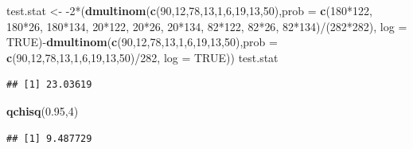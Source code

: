 \documentclass[]{book}
\newenvironment{Shaded}{\begin{snugshade}}{\end{snugshade}}
\newcommand{\KeywordTok}[1]{\textcolor[rgb]{0.13,0.29,0.53}{\textbf{{#1}}}}
\newcommand{\DataTypeTok}[1]{\textcolor[rgb]{0.13,0.29,0.53}{{#1}}}
\newcommand{\DecValTok}[1]{\textcolor[rgb]{0.00,0.00,0.81}{{#1}}}
\newcommand{\FloatTok}[1]{\textcolor[rgb]{0.00,0.00,0.81}{{#1}}}
\newcommand{\StringTok}[1]{\textcolor[rgb]{0.31,0.60,0.02}{{#1}}}
\newcommand{\OtherTok}[1]{\textcolor[rgb]{0.56,0.35,0.01}{{#1}}}
\newcommand{\NormalTok}[1]{{#1}}
\begin{document}
\begin{Shaded}
\begin{Highlighting}[]
\NormalTok{test.stat <-}\StringTok{ }\NormalTok{-}\DecValTok{2}\NormalTok{*(}\KeywordTok{dmultinom}\NormalTok{(}\KeywordTok{c}\NormalTok{(}\DecValTok{90}\NormalTok{,}\DecValTok{12}\NormalTok{,}\DecValTok{78}\NormalTok{,}\DecValTok{13}\NormalTok{,}\DecValTok{1}\NormalTok{,}\DecValTok{6}\NormalTok{,}\DecValTok{19}\NormalTok{,}\DecValTok{13}\NormalTok{,}\DecValTok{50}\NormalTok{),}\DataTypeTok{prob =} \KeywordTok{c}\NormalTok{(}\DecValTok{180}\NormalTok{*}\DecValTok{122}\NormalTok{, }\DecValTok{180}\NormalTok{*}\DecValTok{26}\NormalTok{, }\DecValTok{180}\NormalTok{*}\DecValTok{134}\NormalTok{, }\DecValTok{20}\NormalTok{*}\DecValTok{122}\NormalTok{, }\DecValTok{20}\NormalTok{*}\DecValTok{26}\NormalTok{, }\DecValTok{20}\NormalTok{*}\DecValTok{134}\NormalTok{, }\DecValTok{82}\NormalTok{*}\DecValTok{122}\NormalTok{, }\DecValTok{82}\NormalTok{*}\DecValTok{26}\NormalTok{, }\DecValTok{82}\NormalTok{*}\DecValTok{134}\NormalTok{)/(}\DecValTok{282}\NormalTok{*}\DecValTok{282}\NormalTok{), }\DataTypeTok{log =} \OtherTok{TRUE}\NormalTok{)-}\KeywordTok{dmultinom}\NormalTok{(}\KeywordTok{c}\NormalTok{(}\DecValTok{90}\NormalTok{,}\DecValTok{12}\NormalTok{,}\DecValTok{78}\NormalTok{,}\DecValTok{13}\NormalTok{,}\DecValTok{1}\NormalTok{,}\DecValTok{6}\NormalTok{,}\DecValTok{19}\NormalTok{,}\DecValTok{13}\NormalTok{,}\DecValTok{50}\NormalTok{),}\DataTypeTok{prob =} \KeywordTok{c}\NormalTok{(}\DecValTok{90}\NormalTok{,}\DecValTok{12}\NormalTok{,}\DecValTok{78}\NormalTok{,}\DecValTok{13}\NormalTok{,}\DecValTok{1}\NormalTok{,}\DecValTok{6}\NormalTok{,}\DecValTok{19}\NormalTok{,}\DecValTok{13}\NormalTok{,}\DecValTok{50}\NormalTok{)/}\DecValTok{282}\NormalTok{, }\DataTypeTok{log =} \OtherTok{TRUE}\NormalTok{))}
\NormalTok{test.stat}
\end{Highlighting}
\end{Shaded}

\begin{verbatim}
## [1] 23.03619
\end{verbatim}

\begin{Shaded}
\begin{Highlighting}[]
\KeywordTok{qchisq}\NormalTok{(}\FloatTok{0.95}\NormalTok{,}\DecValTok{4}\NormalTok{)}
\end{Highlighting}
\end{Shaded}

\begin{verbatim}
## [1] 9.487729
\end{verbatim}
\end{document}
